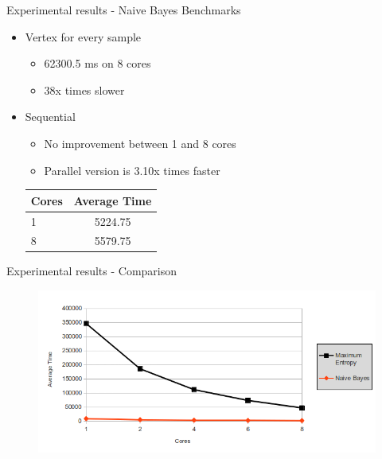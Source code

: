 \documentclass{beamer}
\begin{document}
\begin{frame}{Experimental results -  Naive Bayes Benchmarks}

\begin{itemize}

\item{Vertex for every sample}

\begin{itemize}
\item  62300.5 ms on 8 cores 
\item  38x times slower
\end{itemize}

\item{Sequential}

\begin{itemize}
\item No improvement between 1 and 8 cores
\item Parallel version is 3.10x times faster
\end{itemize}

\begin{table}[!htb]
\centering
\begin{tabular}{ l c }
    \hline\hline
    Cores & Average Time \\ [0.2ex]
    \hline
    1 & 5224.75 \\
    8 & 5579.75  \\
    \hline
  \end{tabular}
\label{table:naivebayes2}
\end{table}

\end{itemize}

\end{frame}


\begin{frame}{Experimental results - Comparison}

\begin{figure}[!htb]
  \centering
  \includegraphics[scale=0.45]{presentation/comparison.png}
\end{figure}

\end{frame}
\end{document}
